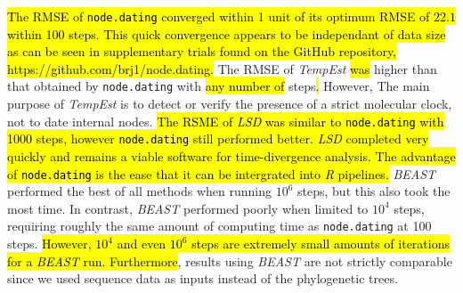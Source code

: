 \documentclass{bioinfo}
\newcommand{\code}[1]{{\tt #1}}
\newcommand{\edit}[1]{\hl{#1}}
\begin{document}
\edit{The RMSE of {\tt node.dating} converged within 1 unit of its optimum RMSE of $22.1$ within 100 steps.
This quick convergence appears to be independant of data size as can be seen in supplementary trials found on the GitHub repository, https://github.com/brj1/node.dating.}
The\edit{ }RMSE\edit{} of \emph{TempEst} \edit{was} higher than that obtained by \code{node.dating} with \edit{any number of} steps\edit{.}
However, The main purpose of \emph{TempEst} is to detect or verify the presence of a strict molecular clock, not to date internal nodes.
\edit{The RSME of \emph{LSD} was similar to {\tt node.dating} with 1000 steps, however {\tt node.dating} still performed better.
\emph{LSD} completed very quickly and remains a viable software for time-divergence analysis.
The advantage of {\tt node.dating} is the ease that it can be intergrated into \emph{R} pipelines.}
\emph{BEAST} performed the best of all methods when running $10^6$ steps, but this also took the most time.
In contrast, \emph{BEAST} performed poorly when limited to $10^4$ steps, requiring roughly the same amount of computing time as \code{node.dating} at 100 steps.
\edit{However, $10^4$ and even $10^6$ steps are extremely small amounts of iterations for a \emph{BEAST} run.
Furthermore}, results using \emph{BEAST} are not strictly comparable since we used sequence data as inputs instead of the phylogenetic trees.
\end{document}

